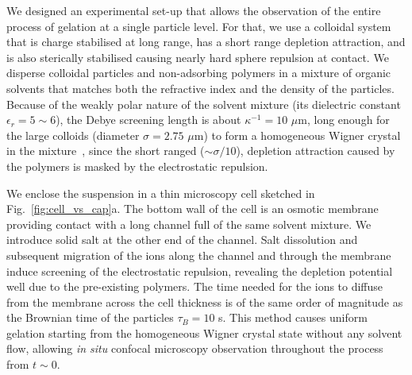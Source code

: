 \documentclass[footinbib,amsmath,amssymb,superscriptaddress,twocolumn]{revtex4}
\begin{document}




We designed an experimental set-up that allows the observation of the entire process of gelation at a single particle level. For that, we use a colloidal system that is charge stabilised at long range, has a short range depletion attraction, and is also sterically stabilised causing nearly hard sphere repulsion at contact. We disperse colloidal particles and non-adsorbing polymers in a  mixture of organic solvents that matches both the refractive index and the density of the particles. Because of the weakly polar nature of the solvent mixture (its dielectric constant $\epsilon_r = 5\sim6$), the Debye screening length is about $\kappa^{-1}=10$ $\mu$m, long enough for the large colloids (diameter $\sigma=2.75$ $\mu$m) to form a homogeneous Wigner crystal in the mixture~\cite{klix2010structural}, since the short ranged ($\sim \sigma/10$), depletion attraction caused by the polymers is masked by the electrostatic repulsion.

We enclose the suspension in a thin microscopy cell sketched in Fig.~\ref{fig:cell_vs_cap}a. The bottom wall of the cell is an osmotic membrane providing contact with a long channel full of the same solvent mixture. We introduce solid salt at the other end of the channel. Salt dissolution and subsequent migration of the ions along the channel and through the membrane induce screening of the electrostatic repulsion, revealing the depletion potential well due to the pre-existing polymers. The time needed for the ions to diffuse from the membrane across the cell thickness is of the same order of magnitude as the Brownian time of the particles $\tau_B=10$ s. This method causes uniform gelation starting from the homogeneous Wigner crystal state without any solvent flow, allowing \textit{in situ} confocal microscopy observation throughout the process from $t \sim 0$.
\end{document}
